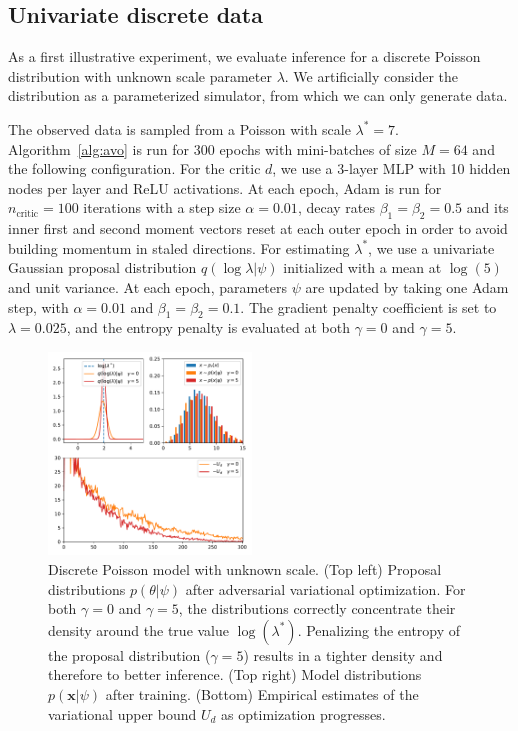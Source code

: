 \documentclass[twocolumn,superscriptaddress,aps]{revtex4-1}
\theoremstyle{plain}
\begin{document}
\subsection{Univariate discrete data}

As a first illustrative experiment, we evaluate inference for a discrete Poisson
distribution with unknown scale parameter $\lambda$. We artificially consider
the distribution as a parameterized simulator, from which we can only
generate data.

The observed data is sampled from a Poisson with scale $\lambda^* = 7$.
Algorithm~\ref{alg:avo} is run for 300 epochs with mini-batches of size $M=64$
and the following configuration. For the critic $d$, we use a 3-layer MLP with 10
hidden nodes per layer and ReLU activations. At each epoch, Adam is run for
$n_\text{critic}=100$ iterations with a step size $\alpha=0.01$, decay rates
$\beta_1=\beta_2=0.5$ and its inner first and second moment vectors reset at
each outer epoch in order to avoid building momentum in staled directions.  For
estimating $\lambda^*$, we use a univariate Gaussian proposal distribution
$q(\log \lambda|\psi)$ initialized with a mean at $\log(5)$ and unit variance. At
each epoch, parameters $\psi$ are updated by taking one Adam step, with
$\alpha=0.01$ and $\beta_1=\beta_2=0.1$. The gradient penalty coefficient is set to
$\lambda=0.025$, and the entropy penalty is evaluated at both $\gamma=0$ and $\gamma=5$.

\begin{figure}
    \centering
    \includegraphics[width=0.48\textwidth]{figures/poisson.pdf}
    \caption{Discrete Poisson model with unknown scale.
             (Top left) Proposal distributions $p(\theta|\psi)$ after adversarial variational optimization. For both $\gamma=0$ and $\gamma=5$, the distributions correctly concentrate their density around
                        the true value $\log(\lambda^*)$. Penalizing the entropy of the proposal distribution ($\gamma=5$) results in a tighter density and therefore to better inference.
             (Top right) Model distributions $p(\mathbf{x}|\psi)$ after training.
             (Bottom) Empirical estimates of the variational upper bound $U_d$ as optimization progresses.
             }\label{fig:poisson}
\end{figure}
\end{document}
